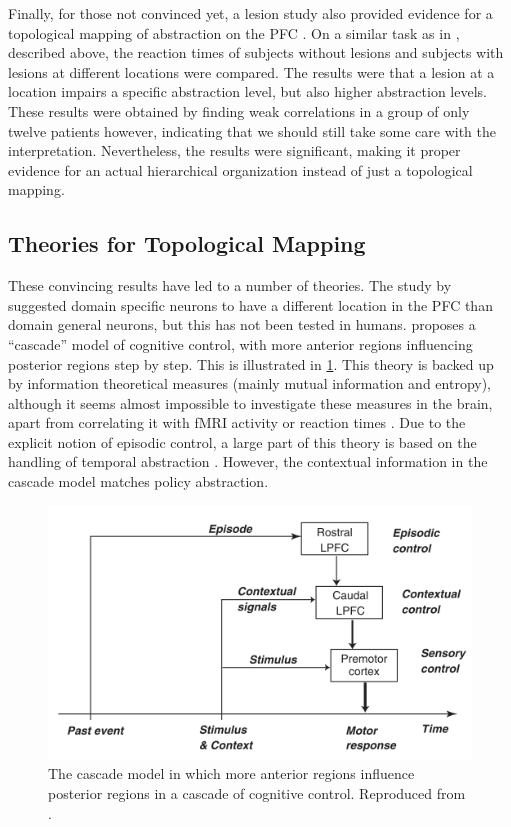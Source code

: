 \documentclass[10pt,a4paper]{report}
\begin{document}
Finally, for those not convinced yet, a lesion study also provided evidence for a topological mapping of abstraction on the PFC \citep{Badre2009a}. On a similar task as in \citet{Badre2007}, described above, the reaction times of subjects without lesions and subjects with lesions at different locations were compared. The results were that a lesion at a location impairs a specific abstraction level, but also higher abstraction levels. These results were obtained by finding weak correlations in a group of only twelve patients however, indicating that we should still take some care with the interpretation. Nevertheless, the results were significant, making it proper evidence for an actual hierarchical organization instead of just a topological mapping.

\subsection*{Theories for Topological Mapping}

These convincing results have led to a number of theories. The study by \citet{Petrides1991} suggested domain specific neurons to have a different location in the PFC than domain general neurons, but this has not been tested in humans. \citet{Koechlin2003} proposes a ``cascade'' model of cognitive control, with more anterior regions influencing posterior regions step by step. This is illustrated in \ref{Koechlin}. This theory is backed up by information theoretical measures (mainly mutual information and entropy), although it seems almost impossible to investigate these measures in the brain, apart from correlating it with fMRI activity or reaction times \citep{Koechlin2007a}. Due to the explicit notion of episodic control, a large part of this theory is based on the handling of temporal abstraction \citep{Koechlin2007}. However, the contextual information in the cascade model matches policy abstraction.

\begin{figure}[bthp]
\begin{center}
\includegraphics[scale=0.5]{figures/koechlin.png}
\caption{The cascade model in which more anterior regions influence posterior regions in a cascade of cognitive control. Reproduced from \citet{Koechlin2003}. }
\label{Koechlin}
\end{center}
\end{figure}
\end{document}
